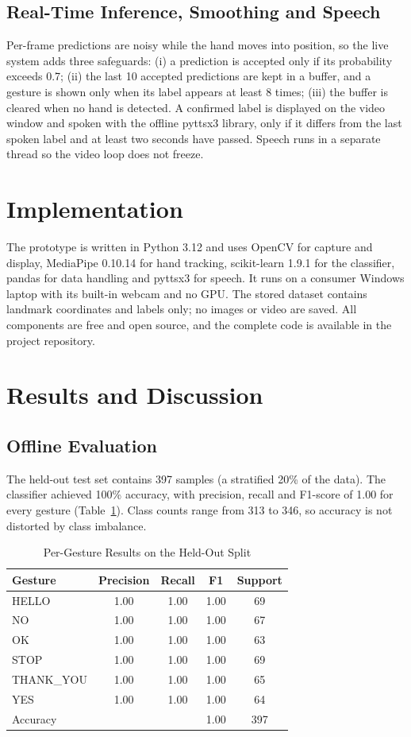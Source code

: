 \documentclass[conference]{IEEEtran}
\begin{document}
\subsection{Real-Time Inference, Smoothing and Speech}
Per-frame predictions are noisy while the hand moves into position, so the live system adds three safeguards: (i) a prediction is accepted only if its probability exceeds 0.7; (ii) the last 10 accepted predictions are kept in a buffer, and a gesture is shown only when its label appears at least 8 times; (iii) the buffer is cleared when no hand is detected. A confirmed label is displayed on the video window and spoken with the offline pyttsx3 library, only if it differs from the last spoken label and at least two seconds have passed. Speech runs in a separate thread so the video loop does not freeze.

\section{Implementation}
The prototype is written in Python 3.12 and uses OpenCV \cite{bradski2000} for capture and display, MediaPipe 0.10.14 for hand tracking, scikit-learn 1.9.1 for the classifier, pandas for data handling and pyttsx3 for speech. It runs on a consumer Windows laptop with its built-in webcam and no GPU. The stored dataset contains landmark coordinates and labels only; no images or video are saved. All components are free and open source, and the complete code is available in the project repository.

\section{Results and Discussion}
\subsection{Offline Evaluation}
The held-out test set contains 397 samples (a stratified 20\% of the data). The classifier achieved 100\% accuracy, with precision, recall and F1-score of 1.00 for every gesture (Table~\ref{tab:results}). Class counts range from 313 to 346, so accuracy is not distorted by class imbalance.

\begin{table}[t]
\caption{Per-Gesture Results on the Held-Out Split}
\label{tab:results}
\centering
\begin{tabular}{lcccc}
\toprule
Gesture & Precision & Recall & F1 & Support \\
\midrule
HELLO & 1.00 & 1.00 & 1.00 & 69 \\
NO & 1.00 & 1.00 & 1.00 & 67 \\
OK & 1.00 & 1.00 & 1.00 & 63 \\
STOP & 1.00 & 1.00 & 1.00 & 69 \\
THANK\_YOU & 1.00 & 1.00 & 1.00 & 65 \\
YES & 1.00 & 1.00 & 1.00 & 64 \\
\midrule
Accuracy & & & 1.00 & 397 \\
\bottomrule
\end{tabular}
\end{table}
\end{document}
